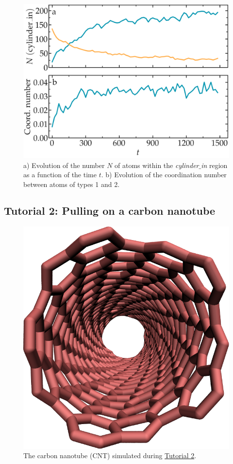 \documentclass[9pt,tutorial]{livecoms}
\begin{document}
\begin{figure}
\centering
\includegraphics[width=\linewidth]{LJ-mixing}
\caption{a) Evolution of the number $N$ of atoms within the \textit{cylinder$\_$in} region as a function of the time $t$. b) Evolution of the coordination number between atoms of types 1 and 2.}
\label{fig:mixing}
\end{figure}

\subsection{Tutorial 2: Pulling on a carbon nanotube}
\label{carbon-nanotube-label}

\begin{figure}
\centering
\includegraphics[width=0.55\linewidth]{CNT}
\caption{The carbon nanotube (CNT) simulated during \hyperref[carbon-nanotube-label]{Tutorial 2}.}
\label{fig:CNT}
\end{figure}
\end{document}
